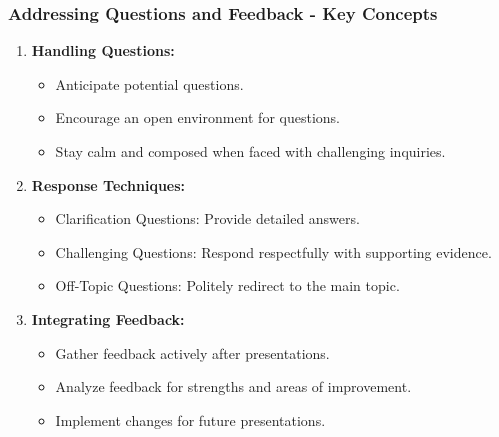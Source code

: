 \documentclass[aspectratio=169]{beamer}
\begin{document}
\begin{frame}[fragile]
    \frametitle{Addressing Questions and Feedback - Key Concepts}
    \begin{enumerate}
        \item \textbf{Handling Questions:}
        \begin{itemize}
            \item Anticipate potential questions.
            \item Encourage an open environment for questions.
            \item Stay calm and composed when faced with challenging inquiries.
        \end{itemize}
        
        \item \textbf{Response Techniques:}
        \begin{itemize}
            \item Clarification Questions: Provide detailed answers.
            \item Challenging Questions: Respond respectfully with supporting evidence.
            \item Off-Topic Questions: Politely redirect to the main topic.
        \end{itemize}
        
        \item \textbf{Integrating Feedback:}
        \begin{itemize}
            \item Gather feedback actively after presentations.
            \item Analyze feedback for strengths and areas of improvement.
            \item Implement changes for future presentations.
        \end{itemize}
    \end{enumerate}
\end{frame}
\end{document}
